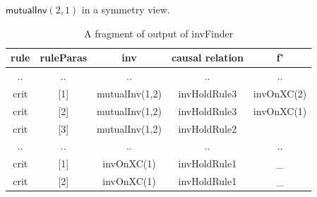 \documentclass[final]{IEEEtran}
\def \eqc {=}
\def \andc {\wedge }
\def \negc {\lnot}
\begin{document}
\begin{description}
$\mathsf{mutualInv}(2,1)$ in a symmetry view. %


\end{description}


\vspace{-0.5cm}
 \begin{table}[htbp]
\centering \caption{A fragment of output of {\sf invFinder}\label{table:groundCausalRelation}} %
\begin{tabular}{|c|c|c|c|c|  }
\hline
  rule& ruleParas&inv&causal relation &   f'  \\
\hline
  .. & ..&.. &..&.. \\

\hline
  crit  & [1]&mutualInv(1,2)& invHoldRule3 &invOnXC(2) \\
\hline
  crit &[2]& mutualInv(1,2)& invHoldRule3 &invOnXC(1)  \\
\hline
  crit & [3]& mutualInv(1,2) & invHoldRule2  & \\
\hline
  .. & ..&.. &..&.. \\

\hline
  crit  & [1]&invOnXC(1) & invHoldRule1 &\_ \\
\hline
  crit &[2]& invOnXC(1) & invHoldRule1 &\_  \\
\hline
\end{tabular}
\end{table}
\end{document}
